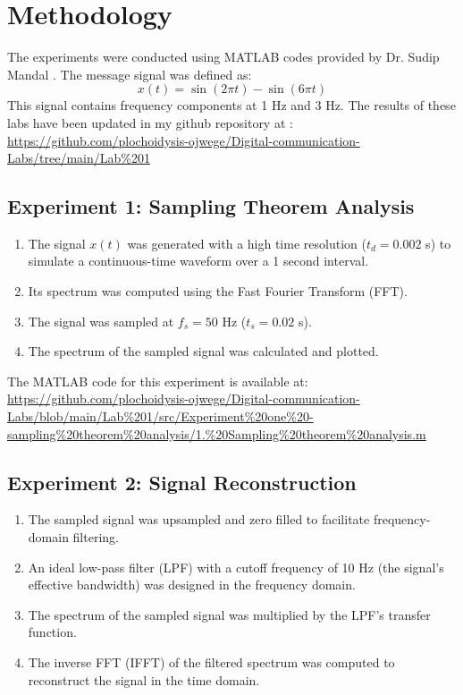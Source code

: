 \documentclass[conference]{IEEEtran}
\begin{document}
\section{Methodology}
The experiments were conducted using MATLAB codes provided by Dr. Sudip Mandal \cite{mandal2025}. The message signal was defined as:
\begin{equation}
x(t) = \sin(2\pi t) - \sin(6\pi t)
\end{equation}
This signal contains frequency components at 1 Hz and 3 Hz.
The results of these labs have been updated in my github repository at :
\url{https://github.com/plochoidysis-ojwege/Digital-communication-Labs/tree/main/Lab%201}
\subsection{Experiment 1: Sampling Theorem Analysis}
\begin{enumerate}
    \item The signal $x(t)$ was generated with a high time resolution ($t_d = 0.002$ s) to simulate a continuous-time waveform over a 1 second interval.
    \item Its spectrum was computed using the Fast Fourier Transform (FFT).
    \item The signal was sampled at $f_s = 50$ Hz ($t_s = 0.02$ s).
    \item The spectrum of the sampled signal was calculated and plotted.
\end{enumerate}

The MATLAB code for this experiment is available at:
\url{https://github.com/plochoidysis-ojwege/Digital-communication-Labs/blob/main/Lab%201/src/Experiment%20one%20-sampling%20theorem%20analysis/1.%20Sampling%20theorem%20analysis.m}


\subsection{Experiment 2: Signal Reconstruction}
\begin{enumerate}
    \item The sampled signal was upsampled and zero filled to facilitate frequency-domain filtering.
    \item An ideal low-pass filter (LPF) with a cutoff frequency of 10 Hz (the signal's effective bandwidth) was designed in the frequency domain.
    \item The spectrum of the sampled signal was multiplied by the LPF's transfer function.
    \item The inverse FFT (IFFT) of the filtered spectrum was computed to reconstruct the signal in the time domain.
\end{enumerate}
\end{document}
